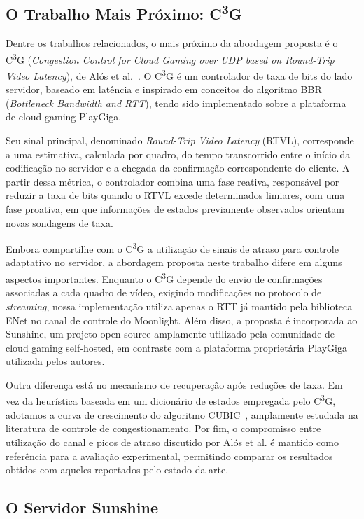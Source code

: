 \documentclass[conference]{IEEEtran}
\begin{document}
\subsection{O Trabalho Mais Próximo: C\textsuperscript{3}G}

Dentre os trabalhos relacionados, o mais próximo da abordagem proposta é o C\textsuperscript{3}G (\emph{Congestion Control for Cloud Gaming over UDP based on Round-Trip Video Latency}), de Alós et al.~\cite{alos2019}. O C\textsuperscript{3}G é um controlador de taxa de bits do lado servidor, baseado em latência e inspirado em conceitos do algoritmo BBR (\emph{Bottleneck Bandwidth and RTT}), tendo sido implementado sobre a plataforma de cloud gaming PlayGiga.

Seu sinal principal, denominado \emph{Round-Trip Video Latency} (RTVL), corresponde a uma estimativa, calculada por quadro, do tempo transcorrido entre o início da codificação no servidor e a chegada da confirmação correspondente do cliente. A partir dessa métrica, o controlador combina uma fase reativa, responsável por reduzir a taxa de bits quando o RTVL excede determinados limiares, com uma fase proativa, em que informações de estados previamente observados orientam novas sondagens de taxa.

Embora compartilhe com o C\textsuperscript{3}G a utilização de sinais de atraso para controle adaptativo no servidor, a abordagem proposta neste trabalho difere em alguns aspectos importantes. Enquanto o C\textsuperscript{3}G depende do envio de confirmações associadas a cada quadro de vídeo, exigindo modificações no protocolo de \emph{streaming}, nossa implementação utiliza apenas o RTT já mantido pela biblioteca ENet no canal de controle do Moonlight. Além disso, a proposta é incorporada ao Sunshine, um projeto open-source amplamente utilizado pela comunidade de cloud gaming self-hosted, em contraste com a plataforma proprietária PlayGiga utilizada pelos autores.

Outra diferença está no mecanismo de recuperação após reduções de taxa. Em vez da heurística baseada em um dicionário de estados empregada pelo C\textsuperscript{3}G, adotamos a curva de crescimento do algoritmo CUBIC~\cite{cubic}, amplamente estudada na literatura de controle de congestionamento. Por fim, o compromisso entre utilização do canal e picos de atraso discutido por Alós et al. é mantido como referência para a avaliação experimental, permitindo comparar os resultados obtidos com aqueles reportados pelo estado da arte.

\subsection{O Servidor Sunshine}
\end{document}
